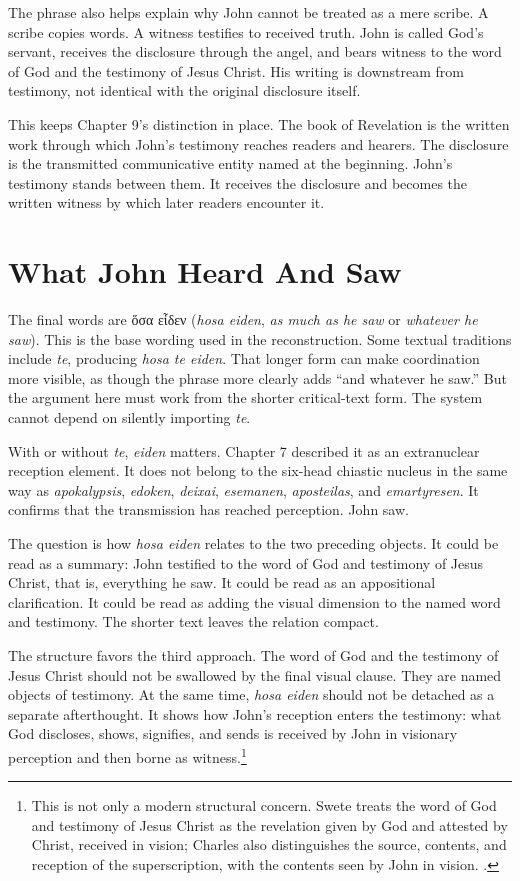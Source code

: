 The phrase also helps explain why John cannot be treated as a mere scribe. A scribe copies words. A witness testifies to received truth. John is called God's servant, receives the disclosure through the angel, and bears witness to the word of God and the testimony of Jesus Christ. His writing is downstream from testimony, not identical with the original disclosure itself.

This keeps Chapter 9's distinction in place. The book of Revelation is the written work through which John's testimony reaches readers and hearers. The disclosure is the transmitted communicative entity named at the beginning. John's testimony stands between them. It receives the disclosure and becomes the written witness by which later readers encounter it.

\section{What John Heard And Saw}

The final words are \textgreek{ὅσα εἶδεν} (\textit{hosa eiden}, \textit{as much as he saw} or \textit{whatever he saw}). This is the base wording used in the reconstruction. Some textual traditions include \textit{te}, producing \textit{hosa te eiden}. That longer form can make coordination more visible, as though the phrase more clearly adds ``and whatever he saw.'' But the argument here must work from the shorter critical-text form. The system cannot depend on silently importing \textit{te}.

With or without \textit{te}, \textit{eiden} matters. Chapter 7 described it as an extranuclear reception element. It does not belong to the six-head chiastic nucleus in the same way as \textit{apokalypsis}, \textit{edoken}, \textit{deixai}, \textit{esemanen}, \textit{aposteilas}, and \textit{emartyresen}. It confirms that the transmission has reached perception. John saw.

The question is how \textit{hosa eiden} relates to the two preceding objects. It could be read as a summary: John testified to the word of God and testimony of Jesus Christ, that is, everything he saw. It could be read as an appositional clarification. It could be read as adding the visual dimension to the named word and testimony. The shorter text leaves the relation compact.

The structure favors the third approach. The word of God and the testimony of Jesus Christ should not be swallowed by the final visual clause. They are named objects of testimony. At the same time, \textit{hosa eiden} should not be detached as a separate afterthought. It shows how John's reception enters the testimony: what God discloses, shows, signifies, and sends is received by John in visionary perception and then borne as witness.\footnote{This is not only a modern structural concern. Swete treats the word of God and testimony of Jesus Christ as the revelation given by God and attested by Christ, received in vision; Charles also distinguishes the source, contents, and reception of the superscription, with the contents seen by John in vision. \autocites[3]{swete1911apocalypse}[1, 5--6]{charles1920revelation}.}

